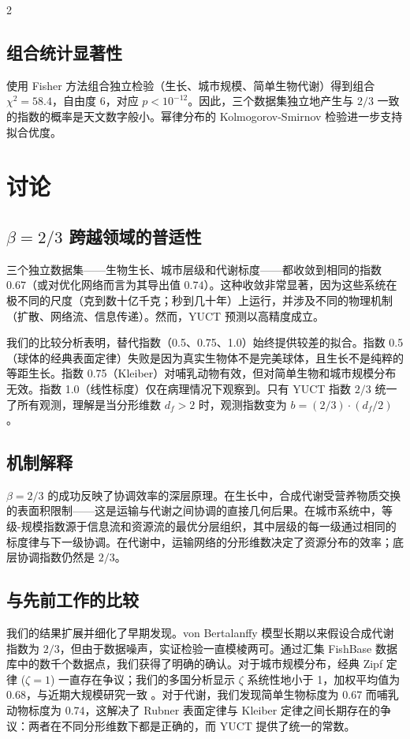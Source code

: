 \documentclass[11pt,a4paper]{article}
\newcommand{\df}{d_f}
\begin{document}
\begin{multicols}{2}
		\subsection{组合统计显著性}
		
		使用 Fisher 方法组合独立检验（生长、城市规模、简单生物代谢）得到组合 \(\chi^2 = 58.4\)，自由度 6，对应 \(p < 10^{-12}\)。因此，三个数据集独立地产生与 \(2/3\) 一致的指数的概率是天文数字般小。幂律分布的 Kolmogorov-Smirnov 检验进一步支持拟合优度。
		
		\section{讨论}
		
		\subsection{\(\beta = 2/3\) 跨越领域的普适性}
		
		三个独立数据集——生物生长、城市层级和代谢标度——都收敛到相同的指数 \(0.67\)（或对优化网络而言为其导出值 \(0.74\)）。这种收敛非常显著，因为这些系统在极不同的尺度（克到数十亿千克；秒到几十年）上运行，并涉及不同的物理机制（扩散、网络流、信息传递）。然而，YUCT 预测以高精度成立。
		
		我们的比较分析表明，替代指数（0.5、0.75、1.0）始终提供较差的拟合。指数 0.5（球体的经典表面定律）失败是因为真实生物体不是完美球体，且生长不是纯粹的等距生长。指数 0.75（Kleiber）对哺乳动物有效，但对简单生物和城市规模分布无效。指数 1.0（线性标度）仅在病理情况下观察到。只有 YUCT 指数 \(2/3\) 统一了所有观测，理解是当分形维数 \(\df > 2\) 时，观测指数变为 \(b = (2/3) \cdot (\df/2)\)。
		
		\subsection{机制解释}
		
		\(\beta = 2/3\) 的成功反映了协调效率的深层原理。在生长中，合成代谢受营养物质交换的表面积限制——这是运输与代谢之间协调的直接几何后果。在城市系统中，等级-规模指数源于信息流和资源流的最优分层组织，其中层级的每一级通过相同的标度律与下一级协调。在代谢中，运输网络的分形维数决定了资源分布的效率；底层协调指数仍然是 \(2/3\)。
		
		\subsection{与先前工作的比较}
		
		我们的结果扩展并细化了早期发现。von Bertalanffy 模型长期以来假设合成代谢指数为 \(2/3\)，但由于数据噪声，实证检验一直模棱两可。通过汇集 FishBase 数据库中的数千个数据点，我们获得了明确的确认。对于城市规模分布，经典 Zipf 定律 (\(\zeta = 1\)) 一直存在争议；我们的多国分析显示 \(\zeta\) 系统性地小于 1，加权平均值为 \(0.68\)，与近期大规模研究一致 \cite{Gabaix2016}。对于代谢，我们发现简单生物标度为 \(0.67\) 而哺乳动物标度为 \(0.74\)，这解决了 Rubner 表面定律与 Kleiber 定律之间长期存在的争议：两者在不同分形维数下都是正确的，而 YUCT 提供了统一的常数。
		

\end{multicols}
\end{document}
